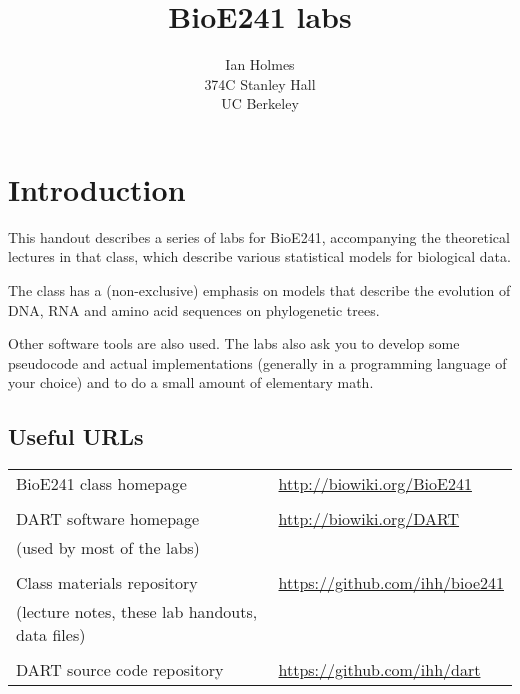 \documentclass[10pt]{book}
\begin{document}
\title{BioE241 labs}
\author{Ian Holmes \\ 374C Stanley Hall \\ UC Berkeley}
\date{}

\maketitle

\titlecite

\tableofcontents

\chapter{Introduction}

This handout describes a series of labs for BioE241,
accompanying the theoretical lectures in that class,
which describe various statistical models for biological data.

The class has a (non-exclusive) emphasis on models that describe the evolution of
DNA, RNA and amino acid sequences on phylogenetic trees.

Other software tools are also used.
The labs also ask you to develop some pseudocode and actual implementations
(generally in a programming language of your choice)
and to do a small amount of elementary math.

\section{Useful URLs}

\begin{tabular}{ll}
BioE241 class homepage
 & \url{http://biowiki.org/BioE241} \\
\\
DART software homepage
 & \url{http://biowiki.org/DART} \\
 (used by most of the labs) & \\
\\
Class materials repository
 & \url{https://github.com/ihh/bioe241} \\
 (lecture notes, these lab handouts, data files) & \\
\\
DART source code repository
 & \url{https://github.com/ihh/dart} \\
\end{tabular}

















\end{document}
